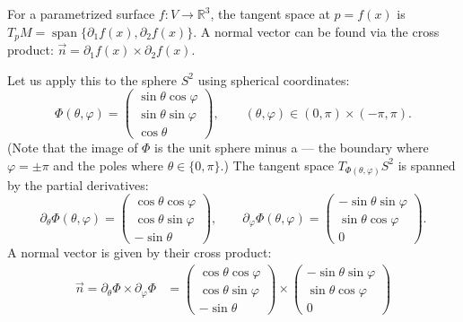 \begin{example}
\label{ex:tangent_normal_parametrized_sphere}
For a parametrized surface $f : V \to \mathbb{R}^3$, the tangent space at $p = f(x)$ is $T_pM = \operatorname{span}\{\partial_1 f(x), \partial_2 f(x)\}$. A normal vector can be found via the cross product: $\vec{n} = \partial_1 f(x) \times \partial_2 f(x)$.

Let us apply this to the sphere $S^2$ using spherical coordinates:
\[\Phi(\theta,\varphi) = \begin{pmatrix} \sin\theta\cos\varphi \\ \sin\theta\sin\varphi \\ \cos\theta \end{pmatrix}, \qquad (\theta,\varphi) \in (0,\pi) \times (-\pi,\pi).\]
(Note that the image of $\Phi$ is the unit sphere minus a  --- the boundary where $\varphi = \pm\pi$ and the poles where $\theta \in \{0,\pi\}$.)
The tangent space $T_{\Phi(\theta,\varphi)} S^2$ is spanned by the partial derivatives:
\[
\partial_\theta \Phi(\theta,\varphi) = \begin{pmatrix} \cos\theta\cos\varphi \\ \cos\theta\sin\varphi \\ -\sin\theta \end{pmatrix}, \qquad
\partial_\varphi \Phi(\theta,\varphi) = \begin{pmatrix} -\sin\theta\sin\varphi \\ \sin\theta\cos\varphi \\ 0 \end{pmatrix}.
\]
A normal vector is given by their cross product:
\begin{align*}
\vec{n} = \partial_\theta \Phi \times \partial_\varphi \Phi
  &= \begin{pmatrix} \cos\theta\cos\varphi \\ \cos\theta\sin\varphi \\ -\sin\theta \end{pmatrix}
     \times
     \begin{pmatrix} -\sin\theta\sin\varphi \\ \sin\theta\cos\varphi \\ 0 \end{pmatrix} \\

\end{align*}
\end{example}
